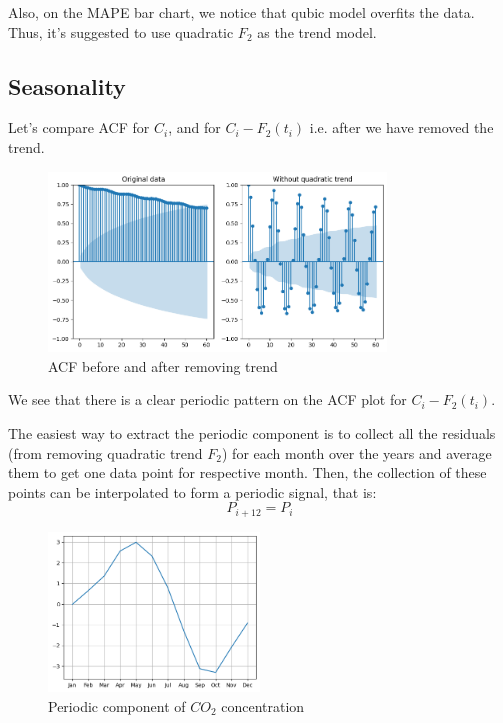\documentclass[12pt,a4paper]{article}
\begin{document}
Also, on the MAPE bar chart, we notice that qubic model overfits the data. Thus, it's suggested to use quadratic $F_2$ as the trend model.

\subsection{Seasonality}

Let's compare ACF for $C_i$, and for $C_i - F_2 (t_i)$ i.e. after we have removed the trend. 

\begin{figure}[h!]
	\centering
	\includegraphics[width=0.8\textwidth]{figures/auto_correlation_trend.png}
	\caption{ACF before and after removing trend}
\end{figure}

We see that there is a clear periodic pattern on the ACF plot for $C_i - F_2 (t_i)$. 

The easiest way to extract the periodic component is to collect all the residuals (from removing quadratic trend $F_2$) for each month over the years and average them to get one data point for respective month. Then, the collection of these points can be interpolated to form a periodic signal, that is:
\begin{equation}
	P_{i+12} = P_i
\end{equation}

\begin{figure}[h!]
	\centering
	\includegraphics[width=0.5\textwidth]{figures/periodic_part.png}
	\caption{Periodic component of $CO_2$ concentration}
\end{figure}
\end{document}
